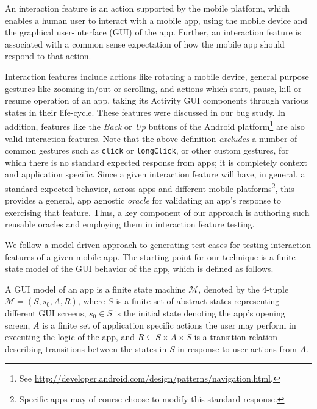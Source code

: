 
\begin{mydef}
\label{def:interactionFeature}
An interaction feature is an action supported by the mobile platform, which enables a human user to interact with a mobile app, using the mobile device and the graphical user-interface (GUI) of the app. Further, an interaction feature is associated with a common sense expectation of how the mobile app should respond to that action. 
\end{mydef}

Interaction features include actions like rotating a mobile device, general purpose gestures like zooming in/out or scrolling, and actions which start, pause, kill or resume operation of an app, taking its Activity GUI components through various states in their life-cycle. These features were discussed in our bug study. In addition, features like the \textit{Back} or \textit{Up} buttons of the Android platform\footnote{See \url{http://developer.android.com/design/patterns/navigation.html}.} are also valid interaction features. Note that the above definition \textit{excludes} a number of common gestures such as {\small\texttt{click}} or {\small\texttt{longClick}}, or other custom gestures, for which there is no standard expected response from apps; it is completely context and application specific. Since a given interaction feature will have, in general, a standard expected behavior, across apps and different mobile platforms\footnote{Specific apps may of course choose to modify this standard response.}, this provides a general, app agnostic \textit{oracle} for validating an app's response to exercising that feature. Thus, a key component of our approach is authoring such reusable oracles and employing them in interaction feature testing.

We follow a model-driven approach to generating test-cases for testing interaction features of a given mobile app. The starting point for our technique is a finite state model of the GUI behavior of the app, which is defined as follows.

\begin{mydef}
\label{def:GUImodel}
A GUI model of an app is a finite state machine $\mathcal{M}$, denoted by the $4$-tuple $\mathcal{M} = (S, s_0, A, R)$, where $S$ is a finite set of abstract states representing different GUI screens, $s_0 \in S$ is the initial state denoting the app's opening screen, $A$ is a finite set of application specific actions the user may perform in executing the logic of the app, and $R \subseteq S \times A \times S$ is a transition relation describing transitions between the states in $S$ in response to user actions from $A$.  
\end{mydef} 

